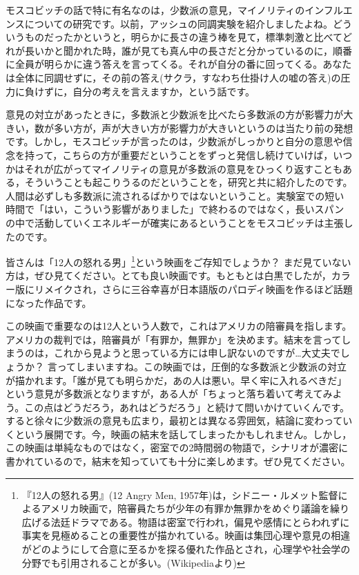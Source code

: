 \documentclass{ltjsbook}
\begin{document}
モスコビッチの話で特に有名なのは，少数派の意見，マイノリティのインフルエンスについての研究です。以前，アッシュの同調実験を紹介しましたよね。どういうものだったかというと，明らかに長さの違う棒を見て，標準刺激と比べてどれが長いかと聞かれた時，誰が見ても真ん中の長さだと分かっているのに，順番に全員が明らかに違う答えを言ってくる。それが自分の番に回ってくる。あなたは全体に同調せずに，その前の答え(サクラ，すなわち仕掛け人の嘘の答え)の圧力に負けずに，自分の考えを言えますか，という話です。

意見の対立があったときに，多数派と少数派を比べたら多数派の方が影響力が大きい，数が多い方が，声が大きい方が影響力が大きいというのは当たり前の発想です。しかし，モスコビッチが言ったのは，少数派がしっかりと自分の意思や信念を持って，こちらの方が重要だということをずっと発信し続けていけば，いつかはそれが広がってマイノリティの意見が多数派の意見をひっくり返すこともある，そういうことも起こりうるのだということを，研究と共に紹介したのです。人間は必ずしも多数派に流されるばかりではないということ。実験室での短い時間で「はい，こういう影響がありました」で終わるのではなく，長いスパンの中で活動していくエネルギーが確実にあるということをモスコビッチは主張したのです。

皆さんは「12人の怒れる男」\footnote{『12人の怒れる男』(12 Angry Men, 1957年)は，シドニー・ルメット監督によるアメリカ映画で，陪審員たちが少年の有罪か無罪かをめぐり議論を繰り広げる法廷ドラマである。物語は密室で行われ，偏見や感情にとらわれずに事実を見極めることの重要性が描かれている。映画は集団心理や意見の相違がどのようにして合意に至るかを探る優れた作品とされ，心理学や社会学の分野でも引用されることが多い。(Wikipediaより)}という映画をご存知でしょうか？ まだ見ていない方は，ぜひ見てください。とても良い映画です。もともとは白黒でしたが，カラー版にリメイクされ，さらに三谷幸喜が日本語版のパロディ映画を作るほど話題になった作品です。

この映画で重要なのは12人という人数で，これはアメリカの陪審員を指します。アメリカの裁判では，陪審員が「有罪か，無罪か」を決めます。結末を言ってしまうのは，これから見ようと思っている方には申し訳ないのですが…大丈夫でしょうか？ 言ってしまいますね。この映画では，圧倒的な多数派と少数派の対立が描かれます。「誰が見ても明らかだ，あの人は悪い。早く牢に入れるべきだ」という意見が多数派となりますが，ある人が「ちょっと落ち着いて考えてみよう。この点はどうだろう，あれはどうだろう」と続けて問いかけていくんです。すると徐々に少数派の意見も広まり，最初とは異なる雰囲気，結論に変わっていくという展開です。今，映画の結末を話してしまったかもしれません。しかし，この映画は単純なものではなく，密室での2時間弱の物語で，シナリオが濃密に書かれているので，結末を知っていても十分に楽しめます。ぜひ見てください。
\end{document}
